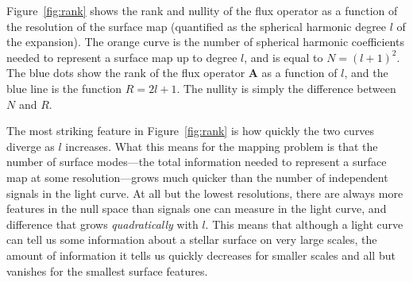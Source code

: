 \documentclass[modern]{aastex62}
\begin{document}
Figure~\ref{fig:rank} shows the rank and nullity of the flux operator
as a function of the resolution of the surface map (quantified as the
spherical harmonic degree $l$ of the expansion). The orange
curve is the number of spherical harmonic coefficients needed to
represent a surface map up to degree $l$, and is equal to $N = (l + 1)^2$.
The blue dots show the rank of the flux operator $\mathbf{A}$ as a function
of $l$, and the blue line is the function $R = 2l + 1$. The nullity is
simply the difference between $N$ and $R$.

The most striking feature in Figure~\ref{fig:rank} is how quickly the two
curves diverge as $l$ increases. What this means for the mapping problem
is that the number of surface modes---the total information needed to
represent a surface map at some resolution---grows much quicker than the
number of independent signals in the light curve.
%
At all but the lowest resolutions, there are always more features in the
null space than signals one can measure in the light curve, and difference
that grows \emph{quadratically} with $l$.
%
This means that although a light curve can tell us some information about
a stellar surface on very large scales, the amount of information it tells
us quickly decreases for smaller scales and all but vanishes for the smallest
surface features.

\end{document}
